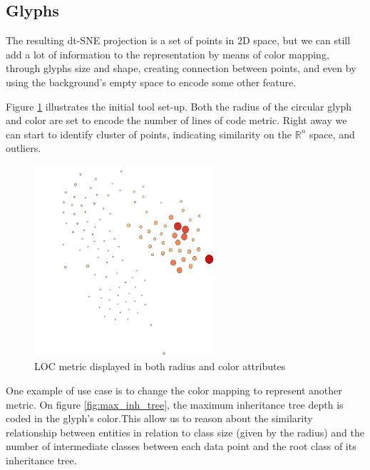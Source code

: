 \subsection{Glyphs} \label{sec:glyphs}
The resulting dt-SNE projection is a set of points in 2D space, but we can still add a lot of information to the representation by means of color mapping, through glyphs size and shape, creating connection between points, and even by using the background's empty space to encode some other feature.

Figure \ref{fig:count_line} illustrates the initial tool set-up. Both the radius of the circular glyph and color are set to encode the number of lines of code metric. Right away we can start to identify cluster of points, indicating similarity on the $\mathbb{R}^{n}$ space, and outliers.

\begin{figure}[H]
  \centering
  \includegraphics[width=0.6\textwidth]{figures/count_line.png}
  \caption{LOC metric displayed in both radius and color attributes}
  \label{fig:count_line}
\end{figure}

One example of use case is to change the color mapping to represent another metric. On figure \ref{fig:max_inh_tree}, the maximum inheritance tree depth is coded in the glyph's color.This allow us to reason about the similarity relationship between entities in relation to class size (given by the radius) and the number of intermediate classes between each data point and the root class of its inheritance tree.

